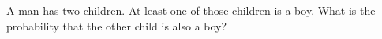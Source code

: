 \documentclass{ximera}
\begin{document}
\begin{question}
A man has two children. At least one of those children is a boy. What is the probability that the other child is also a boy?

    \begin{multipleChoice}
    \end{multipleChoice}

\end{question}
\end{document}
